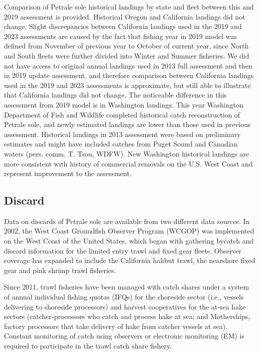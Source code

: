 \documentclass[
]{scrartcl}
\begin{document}
Comparison of Petrale sole historical landings by state and fleet
between this and 2019 assessment is provided. Historical Oregon and
California landings did not change. Slight discrepancies between
California landings used in the 2019 and 2023 assessments are caused by
the fact that fishing year in 2019 model was defined from November of
previous year to October of current year, since North and South fleets
were further divided into Winter and Summer fisheries. We did not have
access to original annual landings used in 2013 full assessment and then
in 2019 update assessment, and therefore comparison between California
landings used in the 2019 and 2023 assessments is approximate, but still
able to illustrate that California landings did not change. The
noticeable difference in this assessment from 2019 model is in
Washington landings. This year Washington Department of Fish and
Wildlife completed historical catch reconstruction of Petrale sole, and
newly estimated landings are lower than those used in previous
assessment. Historical landings in 2013 assessment were based on
preliminary estimates and might have included catches from Puget Sound
and Canadian waters (pers. comm. T. Tsou, WDFW). New Washington
historical landings are more consistent with history of commercial
removals on the U.S. West Coast and represent improvement to the
assessment.

\subsection{Discard}\label{discard}

Data on discards of Petrale sole are available from two different data
sources. In 2002, the West Coast Groundfish Observer Program (WCGOP) was
implemented on the West Coast of the United States, which began with
gathering bycatch and discard information for the limited entry trawl
and fixed gear fleets. Observer coverage has expanded to include the
California halibut trawl, the nearshore fixed gear and pink shrimp trawl
fisheries.

Since 2011, trawl fisheries have been managed with catch shares under a
system of annual individual fishing quotas (IFQs) for the shoreside
sector (i.e., vessels delivering to shoreside processors) and harvest
cooperatives for the at-sea hake sectors (catcher-processors who catch
and process hake at sea; and Motherships, factory processors that take
delivery of hake from catcher vessels at sea). Constant monitoring of
catch using observers or electronic monitoring (EM) is required to
participate in the trawl catch share fishery.
\end{document}
